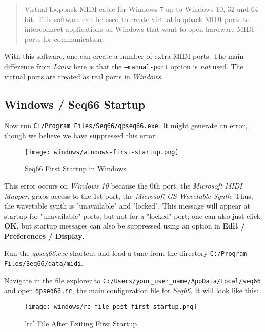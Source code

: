    \begin{quote}
      Virtual loopback MIDI cable for Windows 7 up to Windows 10, 32 and 64
      bit.  This software can be used to create virtual loopback MIDI-ports to
      interconnect applications on Windows that want to open
      hardware-MIDI-ports for communication.
   \end{quote}

   With this software, one can create a number of extra MIDI ports.
   The main difference from \textsl{Linux} here is that the
   \texttt{--manual-port} option is \textsl{not} used.
   The virtual ports are treated as real ports in \textsl{Windows}.

\subsection{Windows / Seq66 Startup}
\label{subsec:windows_seq66_startup}

   Now run \texttt{C:/Program Files/Seq66/qpseq66.exe}.
   It might generate an error, though we believe we have suppressed
   this error:

\begin{figure}[H]
   \centering 
   \texttt{[image: windows/windows-first-startup.png]}
   \caption{Seq66 First Startup in Windows}
   \label{fig:windows_first_startup}
\end{figure}

   This error occurs on \textsl{Windows 10} because the 0th port, the
   \textsl{Microsoft MIDI Mapper}, grabs access to the 1st port, the
   \textsl{Microsoft GS Wavetable Synth}.
   Thus, the wavetable synth is "unavailable" and "locked".
   This message will appear at startup for "unavailable" ports,
   but not for a "locked" port; one can also just click
   \textbf{OK}, but startup messages can also be suppressed using an option in
   \textbf{Edit / Preferences / Display}.

   Run the \textsl{qpseq66.exe} shortcut and load a tune from the
   directory \texttt{C:/Program Files/Seq66/data/midi}.

   Navigate in the file explorer to
   \texttt{C:/Users/your\_user\_name/AppData/Local/seq66} and open
   \texttt{qpseq66.rc}, the main configuration file for \textsl{Seq66}.
   It will look like this:

\begin{figure}[H]
   \centering 
   \texttt{[image: windows/rc-file-post-first-startup.png]}
   \caption{'rc' File After Exiting First Startup}
   \label{fig:windows_rc_file_post_first_startup}
\end{figure}

